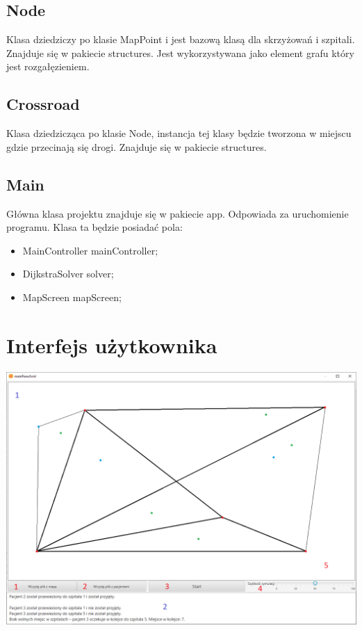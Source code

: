 \documentclass{article}
\begin{document}
    \subsection{Node}
    Klasa dziedziczy po klasie MapPoint i jest bazową klasą dla skrzyżowań i szpitali. Znajduje się w pakiecie structures. Jest wykorzystywana jako element grafu który jest rozgałęzieniem.

    \subsection{Crossroad}
    Klasa dziedzicząca po klasie Node, instancja tej klasy będzie tworzona w miejscu gdzie przecinają się drogi. Znajduje się w pakiecie structures.

    \subsection{Main}
    Główna klasa projektu znajduje się w pakiecie app. Odpowiada za uruchomienie programu. Klasa ta będzie posiadać pola:
    \begin{itemize}
        \item MainController mainController;
        \item DijkstraSolver solver;
        \item MapScreen mapScreen;
    \end{itemize}


\section{Interfejs użytkownika}
    \begin{center}
        \includegraphics[scale=0.4]{GUI_impl.png}
    \end{center}
\end{document}
